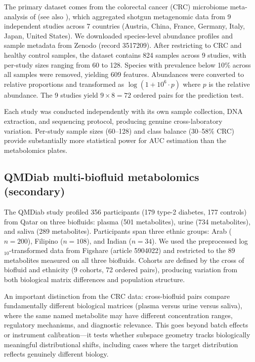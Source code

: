 \documentclass{article}
\begin{document}
The primary dataset comes from the colorectal cancer (CRC) microbiome meta-analysis of \citet{wirbel2019meta} (see also \citealp{thomas2019metaanalysis}), which aggregated shotgun metagenomic data from 9 independent studies across 7 countries (Austria, China, France, Germany, Italy, Japan, United States). We downloaded species-level abundance profiles and sample metadata from Zenodo (record 3517209). After restricting to CRC and healthy control samples, the dataset contains 824 samples across 9 studies, with per-study sizes ranging from 60 to 128. Species with prevalence below 10\% across all samples were removed, yielding 609 features. Abundances were converted to relative proportions and transformed as $\log(1 + 10^6 \cdot p)$ where $p$ is the relative abundance. The 9 studies yield $9 \times 8 = 72$ ordered pairs for the prediction test.

Each study was conducted independently with its own sample collection, DNA extraction, and sequencing protocol, producing genuine cross-laboratory variation. Per-study sample sizes (60--128) and class balance (30--58\% CRC) provide substantially more statistical power for AUC estimation than the metabolomics plates.

\subsection{QMDiab multi-biofluid metabolomics (secondary)}
\label{sec:qmdiab_data}

The QMDiab study \citep{yousri2015metabolic} profiled 356 participants (179 type-2 diabetes, 177 controls) from Qatar on three biofluids: plasma (501 metabolites), urine (734 metabolites), and saliva (289 metabolites). Participants span three ethnic groups: Arab ($n = 200$), Filipino ($n = 108$), and Indian ($n = 34$). We used the preprocessed log$_{10}$-transformed data from Figshare (article 5904022) and restricted to the 89 metabolites measured on all three biofluids. Cohorts are defined by the cross of biofluid and ethnicity (9 cohorts, 72 ordered pairs), producing variation from both biological matrix differences and population structure.

An important distinction from the CRC data: cross-biofluid pairs compare fundamentally different biological matrices (plasma versus urine versus saliva), where the same named metabolite may have different concentration ranges, regulatory mechanisms, and diagnostic relevance. This goes beyond batch effects or instrument calibration---it tests whether subspace geometry tracks biologically meaningful distributional shifts, including cases where the target distribution reflects genuinely different biology.
\end{document}
